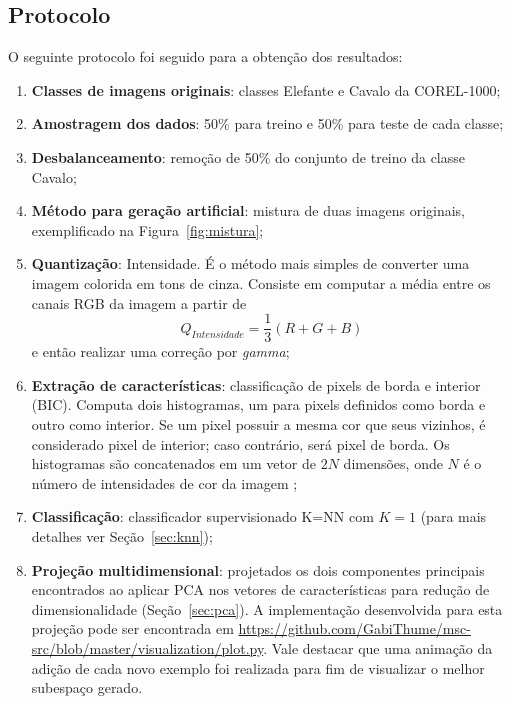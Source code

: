 \subsection{Protocolo}

O seguinte protocolo foi seguido para a obtenção dos resultados:

\begin{enumerate}
\item \textbf{Classes de imagens originais}: classes Elefante e Cavalo da COREL-1000;
\item \textbf{Amostragem dos dados}: 50\% para treino e 50\% para teste de cada classe;
\item \textbf{Desbalanceamento}: remoção de 50\% do conjunto de treino da classe Cavalo;
\item \textbf{Método para geração artificial}: mistura de duas imagens originais, exemplificado na Figura~\ref{fig:mistura};
\item \textbf{Quantização}: Intensidade. É o método mais simples de converter uma imagem colorida em tons de cinza. Consiste em computar a média entre os canais RGB da imagem a partir de
\begin{equation}
	Q_{Intensidade} = \frac{1}{3}(R + G + B)
\end{equation}
\noindent e então realizar uma correção por \textit{gamma};
\item \textbf{Extração de características}: classificação de pixels de borda e interior (BIC). Computa dois histogramas, um para pixels definidos como borda e outro como interior. Se um pixel possuir a mesma cor que seus vizinhos, é considerado pixel de interior; caso contrário, será pixel de borda. Os histogramas são concatenados em um vetor de $2N$ dimensões, onde $N$ é o número de intensidades de cor da imagem \cite{bic};
\item \textbf{Classificação}: classificador supervisionado K=NN com $K = 1$ (para mais detalhes ver Seção~\ref{sec:knn});
\item \textbf{Projeção multidimensional}: projetados os dois componentes principais encontrados ao aplicar PCA nos vetores de características para redução de dimensionalidade (Seção~\ref{sec:pca}). A implementação desenvolvida para esta projeção pode ser encontrada em \url{https://github.com/GabiThume/msc-src/blob/master/visualization/plot.py}. Vale destacar que uma animação da adição de cada novo exemplo foi realizada para fim de visualizar o melhor subespaço gerado.
\end{enumerate}
